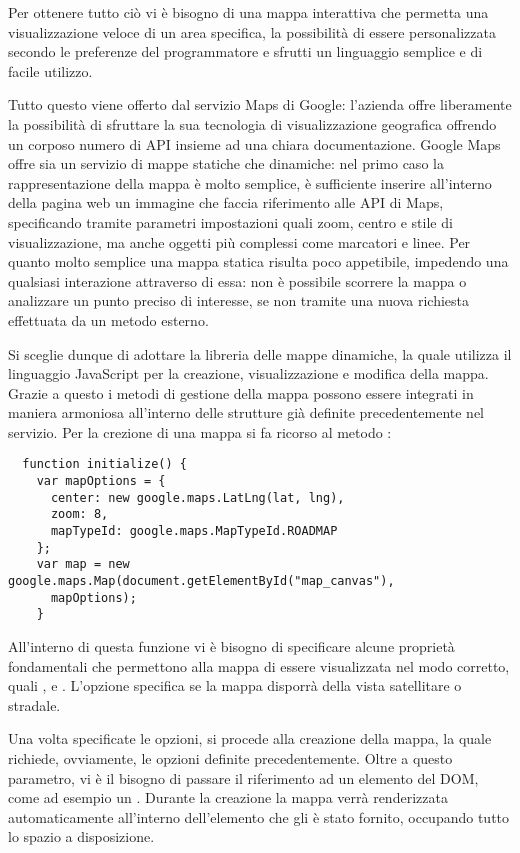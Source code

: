 Per ottenere tutto ciò vi è bisogno di una mappa interattiva che permetta una visualizzazione veloce di un area specifica, la possibilità di essere personalizzata secondo le preferenze del programmatore e sfrutti un linguaggio semplice e di facile utilizzo.

Tutto questo viene offerto dal servizio Maps di Google: l'azienda offre liberamente la possibilità di sfruttare la sua tecnologia di visualizzazione geografica offrendo un corposo numero di API insieme ad una chiara documentazione.
Google Maps offre sia un servizio di mappe statiche che dinamiche: nel primo caso la rappresentazione della mappa è molto semplice, è sufficiente inserire all'interno della pagina web un immagine che faccia riferimento alle API di Maps, specificando tramite parametri impostazioni quali zoom, centro e stile di visualizzazione, ma anche oggetti più complessi come marcatori e linee.
Per quanto molto semplice una mappa statica risulta poco appetibile, impedendo una qualsiasi interazione attraverso di essa: non è possibile scorrere la mappa o analizzare un punto preciso di interesse, se non tramite una nuova richiesta effettuata da un metodo esterno.

Si sceglie dunque di adottare la libreria delle mappe dinamiche, la quale utilizza il linguaggio JavaScript per la creazione, visualizzazione e modifica della mappa. Grazie a questo i metodi di gestione della mappa possono essere integrati in maniera armoniosa all'interno delle strutture già definite precedentemente nel servizio.
\newpage
Per la crezione di una mappa si fa ricorso al metodo :
{\small
\begin{verbatim}
  function initialize() {
    var mapOptions = {
      center: new google.maps.LatLng(lat, lng),
      zoom: 8,
      mapTypeId: google.maps.MapTypeId.ROADMAP
    };
    var map = new google.maps.Map(document.getElementById("map_canvas"),
      mapOptions);
    }
\end{verbatim}
}
All'interno di questa funzione vi è bisogno di specificare alcune proprietà fondamentali che permettono alla mappa di essere visualizzata nel modo corretto, quali ,  e .
L'opzione  specifica se la mappa disporrà della vista satellitare o stradale.

Una volta specificate le opzioni, si procede alla creazione della mappa, la quale richiede, ovviamente, le opzioni definite precedentemente. Oltre a questo parametro, vi è il bisogno di passare il riferimento ad un elemento del DOM, come ad esempio un .
Durante la creazione la mappa verrà renderizzata automaticamente all'interno dell'elemento che gli è stato fornito, occupando tutto lo spazio a disposizione.\\

